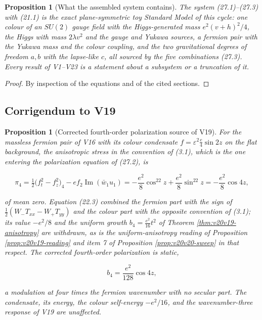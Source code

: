 \documentclass[11pt]{article}
\newtheorem{proposition}[theorem]{Proposition}
\theoremstyle{remark}
\begin{document}
\begin{proposition}[What the assembled system contains]
\label{prop:v20v24-content}
The system (27.1)--(27.3) with (21.1) is the exact plane-symmetric
toy Standard Model of this cycle: one colour of an \(SU(2)\) gauge
field with the Higgs-generated mass \(e^2(v+h)^2/4\), the Higgs with
mass \(2\lambda v^2\) and the gauge and Yukawa sources, a fermion pair
with the Yukawa mass and the colour coupling, and the two
gravitational degrees of freedom \(a,b\) with the lapse-like \(c\),
all sourced by the five combinations (27.3).  Every result of
V1--V23 is a statement about a subsystem or a truncation of it.
\end{proposition}

\begin{proof}
By inspection of the equations and of the cited sections.
\end{proof}

\subsection{Corrigendum to V19}

\begin{proposition}[Corrected fourth-order polarization source of V19]
\label{prop:v20v24-corrigendum}
For the massless fermion pair of V16 with its colour condensate
\(f=\varepsilon^2\tfrac e4\sin2z\) on the flat background, the
anisotropic stress in the convention of (3.1), which is the one
entering the polarization equation of (27.2), is

\[
 \pi_4=\tfrac12\bigl(f_t^2-f_z^2\bigr)_4-ef_2\operatorname{Im}(\bar w_1u_1)
 =-\frac{e^2}8\cos^22z+\frac{e^2}8\sin^22z=-\frac{e^2}8\cos4z,        \tag{27.4}
\]

of mean zero.  Equation (22.3) combined the fermion part with the
sign of \(\tfrac12(W_-T_{xx}-W_+T_{yy})\) and the colour part with the
opposite convention of (3.1); its value \(-e^2/8\) and the uniform
growth \(b_4=\tfrac{e^2}{16}t^2\) of Theorem \ref{thm:v20v19-anisotropy}
are withdrawn, as is the uniform-anisotropy reading of Proposition
\ref{prop:v20v19-reading} and item 7 of Proposition
\ref{prop:v20v20-sweep} in that respect.  The corrected fourth-order
polarization is static,

\[
 b_4=\frac{e^2}{128}\cos4z,                                            \tag{27.5}
\]

a modulation at four times the fermion wavenumber with no secular
part.  The condensate, its energy, the colour self-energy
\(-e^2/16\), and the wavenumber-three response of V19 are unaffected.
\end{proposition}
\end{document}
